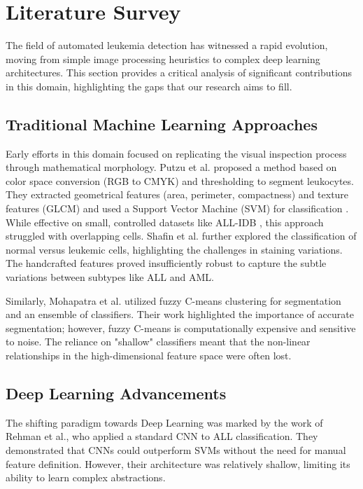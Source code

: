 \documentclass[11pt, a4paper]{article}
\begin{document}
\section{Literature Survey}

The field of automated leukemia detection has witnessed a rapid evolution, moving from simple image processing heuristics to complex deep learning architectures. This section provides a critical analysis of significant contributions in this domain, highlighting the gaps that our research aims to fill.

\subsection{Traditional Machine Learning Approaches}
Early efforts in this domain focused on replicating the visual inspection process through mathematical morphology. Putzu et al. proposed a method based on color space conversion (RGB to CMYK) and thresholding to segment leukocytes. They extracted geometrical features (area, perimeter, compactness) and texture features (GLCM) and used a Support Vector Machine (SVM) for classification \cite{r7}. While effective on small, controlled datasets like ALL-IDB \cite{r7}, this approach struggled with overlapping cells. Shafin et al. \cite{r8} further explored the classification of normal versus leukemic cells, highlighting the challenges in staining variations. The handcrafted features proved insufficiently robust to capture the subtle variations between subtypes like ALL and AML.

Similarly, Mohapatra et al. utilized fuzzy C-means clustering for segmentation and an ensemble of classifiers. Their work highlighted the importance of accurate segmentation; however, fuzzy C-means is computationally expensive and sensitive to noise. The reliance on "shallow" classifiers meant that the non-linear relationships in the high-dimensional feature space were often lost.

\subsection{Deep Learning Advancements}
The shifting paradigm towards Deep Learning was marked by the work of Rehman et al., who applied a standard CNN to ALL classification. They demonstrated that CNNs could outperform SVMs without the need for manual feature definition. However, their architecture was relatively shallow, limiting its ability to learn complex abstractions.
\end{document}
